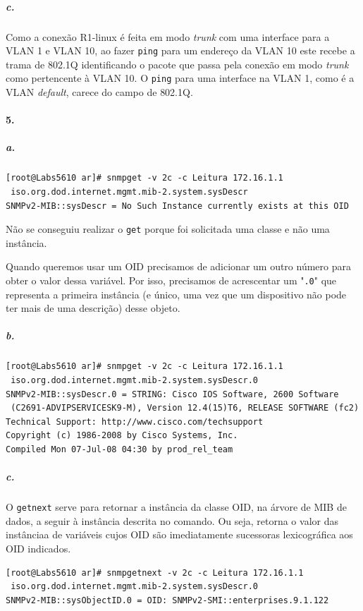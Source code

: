 \subparagraph{c.}
Como a conexão \textsf{R1}-\textsf{linux} é feita em modo \emph{trunk} com uma interface para a VLAN 1 e VLAN 10, ao fazer \texttt{ping} para um endereço da VLAN 10 este recebe a trama de \textsf{802.1Q} identificando o pacote que passa pela conexão em modo \emph{trunk} como pertencente à VLAN 10. O \texttt{ping} para uma interface na VLAN 1, como é a VLAN \emph{default}, carece do campo de \textsf{802.1Q}.

\newpage

\paragraph{5.}

\subparagraph{a.}
\begin{verbatim}
[root@Labs5610 ar]# snmpget -v 2c -c Leitura 172.16.1.1
 iso.org.dod.internet.mgmt.mib-2.system.sysDescr
SNMPv2-MIB::sysDescr = No Such Instance currently exists at this OID
\end{verbatim}

Não se conseguiu realizar o \texttt{get} porque foi solicitada uma classe e não uma instância.

Quando queremos usar um OID precisamos de adicionar um outro número para obter o valor dessa variável. Por isso, precisamos de acrescentar um "\texttt{.0}" que representa a primeira instância (e único, uma vez que um dispositivo não pode ter mais de uma descrição) desse objeto.


\subparagraph{b.}
\begin{verbatim}
[root@Labs5610 ar]# snmpget -v 2c -c Leitura 172.16.1.1
 iso.org.dod.internet.mgmt.mib-2.system.sysDescr.0
SNMPv2-MIB::sysDescr.0 = STRING: Cisco IOS Software, 2600 Software
 (C2691-ADVIPSERVICESK9-M), Version 12.4(15)T6, RELEASE SOFTWARE (fc2)
Technical Support: http://www.cisco.com/techsupport
Copyright (c) 1986-2008 by Cisco Systems, Inc.
Compiled Mon 07-Jul-08 04:30 by prod_rel_team
\end{verbatim}


\subparagraph{c.}
O \texttt{getnext} serve para retornar a instância da classe OID, na árvore de MIB de dados, a seguir à instância descrita no comando. Ou seja, retorna o valor das instânciaa de variáveis cujos OID são imediatamente sucessoras lexicográfica aos OID indicados.


\begin{verbatim}
[root@Labs5610 ar]# snmpgetnext -v 2c -c Leitura 172.16.1.1
 iso.org.dod.internet.mgmt.mib-2.system.sysDescr.0
SNMPv2-MIB::sysObjectID.0 = OID: SNMPv2-SMI::enterprises.9.1.122
\end{verbatim}


